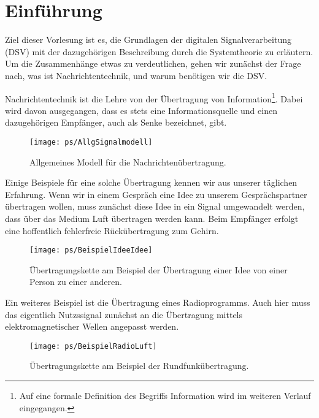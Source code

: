 ﻿\chapter{Einführung}
Ziel dieser Vorlesung ist es, die Grundlagen der digitalen Signalverarbeitung (DSV) mit der dazugehörigen Beschreibung durch die Systemtheorie zu
erläutern. Um die Zusammenhänge etwas zu verdeutlichen, gehen wir zunächst der
Frage nach, was ist Nachrichtentechnik, und warum benötigen wir die DSV.

Nachrichtentechnik ist die Lehre von der Übertragung von
Information\footnote{Auf eine formale Definition des Begriffs
Information wird im weiteren Verlauf eingegangen.}. Dabei wird davon ausgegangen, dass es stets eine
Informationsquelle und einen dazugehörigen Empfänger, auch als Senke bezeichnet, gibt.
%

\begin{figure}[H]
\begin{center}
\texttt{[image: ps/AllgSignalmodell]}
\caption{\label{pic:AllgSignalmodell} Allgemeines Modell für die
Nachrichtenübertragung.}
\end{center}
\end{figure}


Einige Beispiele für eine solche Übertragung
kennen wir aus unserer täglichen Erfahrung. Wenn wir in einem Gespräch eine
Idee zu unserem Gesprächspartner übertragen wollen, muss zunächst diese Idee in ein
Signal umgewandelt werden, dass über das Medium Luft übertragen werden kann. Beim
Empfänger erfolgt eine hoffentlich fehlerfreie Rückübertragung zum Gehirn.
\begin{figure}[H]
\begin{center}
\texttt{[image: ps/BeispielIdeeIdee]}
\caption{\label{pic:BeispielIdeeIdee} Übertragungskette am
Beispiel der Übertragung einer Idee von einer Person zu einer
anderen.}
\end{center}
\end{figure}

Ein weiteres Beispiel ist die Übertragung eines Radioprogramms. Auch hier muss das
eigentlich Nutzssignal zunächst an die Übertragung mittels elektromagnetischer Wellen
angepasst werden.
\begin{figure}[H]
\begin{center}
\texttt{[image: ps/BeispielRadioLuft]}
\caption{\label{pic:BeispielRadio} Übertragungskette am Beispiel
der Rundfunkübertragung.}
\end{center}
\end{figure}

